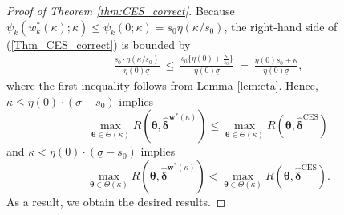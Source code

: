 \documentclass[12pt,a4paper]{article}
\begin{document}
\begin{proof}[Proof of Theorem \ref{thm:CES_correct}]
Because $\psi_k\left( w_k^{\ast}(\kappa) ;\kappa \right) \leq \psi_k\left( 0 ;\kappa \right) = s_0 \eta(\kappa / s_0)$, the right-hand side of (\ref{Thm_CES_correct}) is bounded by
\begin{eqnarray*}
\frac{s_0 \cdot \eta \left( \kappa / s_0 \right)}{\eta(0) \underline{\sigma}} \ \leq \ \frac{s_0 \{ \eta(0) + \frac{\kappa}{s_0} \}}{\eta(0) \underline{\sigma}} \ = \ \frac{ \eta(0) s_0 + \kappa}{\eta(0) \underline{\sigma}},
\end{eqnarray*}
where the first inequality follows from Lemma \ref{lem:eta}. Hence, $\kappa \leq \eta(0) \cdot (\underline{\sigma} - s_0)$ implies 
$$
\max_{\bm{\theta} \in \Theta(\kappa)} R(\bm{\theta},\hat{\bm{\delta}}^{\bm{w}^{\ast}(\kappa)}) \leq \max_{\bm{\theta} \in \Theta(\kappa)} R(\bm{\theta},\hat{\bm{\delta}}^{\mathrm{CES}})
$$ and $\kappa < \eta(0) \cdot (\underline{\sigma} - s_0)$ implies 
$$
\max_{\bm{\theta} \in \Theta(\kappa)} R(\bm{\theta},\hat{\bm{\delta}}^{\bm{w}^{\ast}(\kappa)}) < \max_{\bm{\theta} \in \Theta(\kappa)} R(\bm{\theta},\hat{\bm{\delta}}^{\mathrm{CES}}).
$$
As a result, we obtain the desired results.
\end{proof}\vspace{0.1in}
\end{document}
